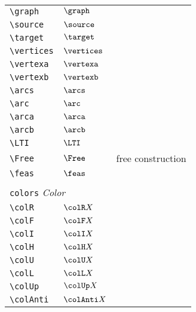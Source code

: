 \begin{longtable}{lll}
 {\color[rgb]{0.5,0.5,0.5}\texttt{\textbackslash graph}} & $\graph$ & \\ 
 {\color[rgb]{0.5,0.5,0.5}\texttt{\textbackslash source}} & $\source$ & \\ 
 {\color[rgb]{0.5,0.5,0.5}\texttt{\textbackslash target}} & $\target$ & \\ 
 {\color[rgb]{0.5,0.5,0.5}\texttt{\textbackslash vertices}} & $\vertices$ & \\ 
 {\color[rgb]{0.5,0.5,0.5}\texttt{\textbackslash vertexa}} & $\vertexa$ & \\ 
 {\color[rgb]{0.5,0.5,0.5}\texttt{\textbackslash vertexb}} & $\vertexb$ & \\ 
 {\color[rgb]{0.5,0.5,0.5}\texttt{\textbackslash arcs}} & $\arcs$ & \\ 
 {\color[rgb]{0.5,0.5,0.5}\texttt{\textbackslash arc}} & $\arc$ & \\ 
 {\color[rgb]{0.5,0.5,0.5}\texttt{\textbackslash arca}} & $\arca$ & \\ 
 {\color[rgb]{0.5,0.5,0.5}\texttt{\textbackslash arcb}} & $\arcb$ & \\ 
 {\color[rgb]{0.5,0.5,0.5}\texttt{\textbackslash LTI}} & $\LTI$ & \\ 
 {\color[rgb]{0.5,0.5,0.5}\texttt{\textbackslash Free}} & $\Free$ &  free construction\\ 
 {\color[rgb]{0.5,0.5,0.5}\texttt{\textbackslash feas}} & $\feas$ & \\ 
  &  & \\ 
 \multicolumn{3}{l}{{\color[rgb]{0.5,0.5,0.5}\texttt{colors}} \emph{Color}}\\ 
 \hline
\hline
{\color[rgb]{0.5,0.5,0.5}\texttt{\textbackslash colR}} & $\colR X$ & \\ 
 {\color[rgb]{0.5,0.5,0.5}\texttt{\textbackslash colF}} & $\colF X$ & \\ 
 {\color[rgb]{0.5,0.5,0.5}\texttt{\textbackslash colI}} & $\colI X$ & \\ 
 {\color[rgb]{0.5,0.5,0.5}\texttt{\textbackslash colH}} & $\colH X$ & \\ 
 {\color[rgb]{0.5,0.5,0.5}\texttt{\textbackslash colU}} & $\colU X$ & \\ 
 {\color[rgb]{0.5,0.5,0.5}\texttt{\textbackslash colL}} & $\colL X$ & \\ 
 {\color[rgb]{0.5,0.5,0.5}\texttt{\textbackslash colUp}} & $\colUp X$ & \\ 
 {\color[rgb]{0.5,0.5,0.5}\texttt{\textbackslash colAnti}} & $\colAnti X$ & \\ 

\end{longtable}
